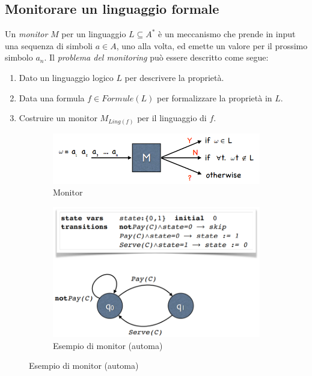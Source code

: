 \documentclass[a4paper,oneside,titlepage]{book}
\begin{document}
\subsection{Monitorare un linguaggio formale}
Un \textit{monitor} $M$ per un linguaggio $L \subseteq A^\ast$ è un meccanismo che prende in input una sequenza di simboli $a \in A$, uno alla volta, ed emette un valore per il prossimo simbolo $a_n$. Il \textit{problema del monitoring} può essere descritto come segue:
\begin{enumerate}
    \item Dato un linguaggio logico $L$ per descrivere la proprietà.
    \item Data una formula $f \in Formule(L)$ per formalizzare la proprietà in $L$.
    \item Costruire un monitor $M_{Ling(f)}$ per il linguaggio di $f$.
\end{enumerate}
\begin{figure}[htp]
	\begin{subfigure}{0.49\textwidth}
	    \centering
		\includegraphics[width=\textwidth, height=\textheight, keepaspectratio]{monitor2.png}
		\caption{Monitor}
	\end{subfigure}
	\hfill
	\begin{subfigure}{0.49\textwidth}
	    \centering
		\includegraphics[width=\textwidth, height=\textheight, keepaspectratio]{monitor3.png}
		\caption{Esempio di monitor (automa)}
	\end{subfigure}
\end{figure}
\end{document}
